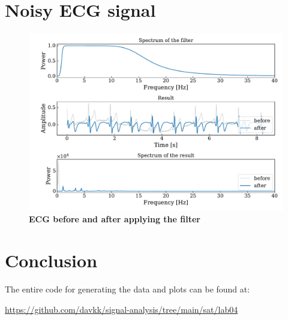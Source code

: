 \documentclass[13pt,a4paper]{article}
\begin{document}
\section{Noisy ECG signal}

\begin{figure}[ht!]
    \centering
    \caption{\textbf{ECG before and after applying the filter}}
    \includegraphics[width=0.9\linewidth]{./ecg_filter.pdf}
\end{figure}

\section{Conclusion}

The entire code for generating the data and plots can be found at:

\url{https://github.com/davkk/signal-analysis/tree/main/sat/lab04}
\end{document}
